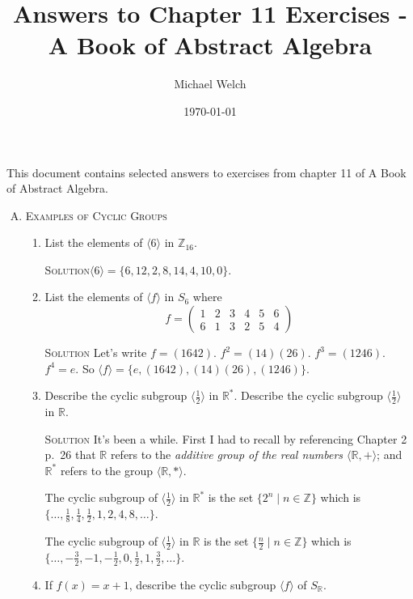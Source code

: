 \documentclass[twoside]{amsart}
\newcommand{\Reals}{\ensuremath{\mathbb{R}}\xspace}
\newcommand{\Integers}{\ensuremath{\mathbb{Z}{}}\xspace}
\newcommand{\solution}{\textsc{Solution}\xspace}
\newcommand{\blank}{\vspace{5pt}}
\newcommand{\ind}{\hspace{.35in}}
\newcommand{\itm}{\blank\item}
\newcommand{\sol}{\blank\noindent\solution}
\newcommand{\cgroup}[1]{\langle #1 \rangle}
\begin{document}
\title{Answers to Chapter 11 Exercises - A Book of Abstract Algebra}
\author{Michael Welch}
\date{\today}
\maketitle

This document contains selected answers to exercises from chapter 11
of A Book of Abstract Algebra.


\begin{enumerate}[A.]
   
   \item \textsc{Examples of Cyclic Groups}

   \begin{enumerate}[1)]
      \itm List the elements of $\cgroup{6}$ in $\Integers_{16}$.

      \sol $\cgroup{6} = \{ 6, 12, 2, 8, 14, 4, 10, 0 \}$.

      \itm List the elements of $\cgroup{f}$ in $S_6$ where
      \[
         f = 
            \begin{pmatrix}
               1 & 2 & 3 & 4 & 5 & 6 \\
               6 & 1 & 3 & 2 & 5 & 4
            \end{pmatrix}
      \]

      \sol Let's write $f = (1642)$. $f^2 = (14)(26)$. $f^3 = (1246)$.
      $f^4 = e$. So $\cgroup{f} = \{ e, (1642), (14)(26), (1246) \}$.

      \itm Describe the cyclic subgroup $\cgroup{\frac{1}{2}}$ in 
      $\Reals^*$. Describe the cyclic subgroup $\langle \frac{1}{2} \rangle$
      in $\Reals$.

      \sol It's been a while. First I had to recall by referencing
      Chapter 2 p.~26 that $\Reals$ refers to the \emph{additive group
        of the real numbers $\langle \Reals, +\rangle$}; and
      $\Reals^*$ refers to the group $\langle \Reals, *\rangle$.

      \ind The cyclic subgroup of $\langle \frac{1}{2} \rangle$ in 
      $\Reals^*$ is the set $\{ 2^n \mid n \in \Integers\}$ which is
      $\{\ldots, \frac{1}{8}, \frac{1}{4}, \frac{1}{2}, 1, 2, 4, 8,
      \ldots \}$.
      
      \ind The cyclic subgroup of $\langle \frac{1}{2} \rangle$ in
      $\Reals$ is the set $\{ \frac{n}{2} \mid n \in \Integers \}$
      which is $\{\ldots, -\frac{3}{2}, -1, -\frac{1}{2}, 0,
      \frac{1}{2}, 1, \frac{3}{2}, \ldots\}$.

      \itm If $f(x) = x + 1$, describe the cyclic subgroup $\langle f
      \rangle$ of $S_\Reals$.


\end{enumerate}
\end{enumerate}
\end{document}
